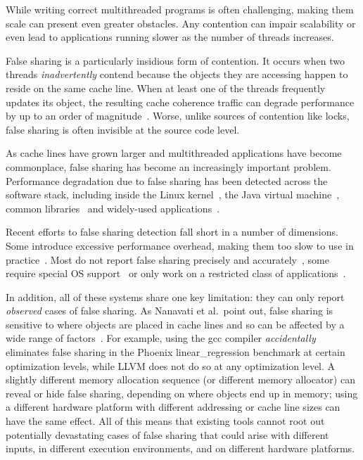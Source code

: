 \label{sec:intro} 

While writing correct multithreaded programs is often challenging,
making them scale can present even greater obstacles. Any contention can impair scalability or even lead to
applications running slower as the number of threads increases.

False sharing is a particularly insidious form of contention.
It occurs when two threads \emph{inadvertently} contend because the objects
they are accessing happen to reside on the same cache line. When at least
one of the threads frequently updates its object, the resulting cache
coherence traffic can degrade performance by up to an order of
magnitude~\cite{falseshareeffect}. Worse, unlike sources of contention like locks, false sharing is often invisible at the source code level.

As cache lines have grown larger and multithreaded applications have
become commonplace, false sharing has become an increasingly important
problem. Performance degradation due to false sharing has been detected across the software stack,
including inside the Linux kernel~\cite{OSfalsesharing}, the Java
virtual machine~\cite{JVMfalsesharing}, common
libraries~\cite{libfalsesharing} and widely-used
applications~\cite{mysql,appfalsesharing}.

Recent efforts to false sharing detection fall short in a number of dimensions. Some introduce excessive performance overhead, making them too slow to use in practice~\cite{falseshare:binaryinstrumentation1,falseshare:binaryinstrumentation2,falseshare:simulator}. Most do not report false sharing precisely and accurately~\cite{falseshare:binaryinstrumentation1,detect:ptu,detect:intel,falseshare:binaryinstrumentation2,DProf,qinzhaodetection}, some require special OS support~\cite{OSdetection} or only work on a restricted class of applications~\cite{sheriff}.

In addition, all of these systems share one key limitation: they can
only report \emph{observed} cases of false sharing. As Nanavati et al.\ point out, false sharing is sensitive to where objects are placed in cache lines and so can be affected by a wide range of factors~\cite{OSdetection}. For example, using the gcc compiler \emph{accidentally} eliminates false sharing in the Phoenix linear\_regression benchmark at certain optimization levels, while LLVM does not do so at any optimization level.  A slightly different memory allocation sequence (or different memory allocator) can reveal or hide
false sharing, depending on where objects end up in memory; using a different hardware platform with different addressing or cache line sizes can have the same effect. All of this means that existing tools cannot root out potentially devastating cases of false sharing that could arise with different inputs, in different execution environments, and on different hardware platforms.

